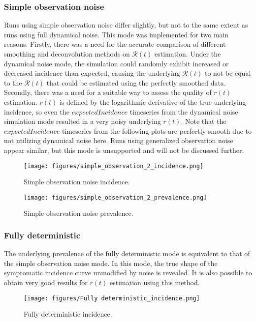 \documentclass{article}
\newcommand{\nR}{\mathscr{R}}
\begin{document}
\subsubsection{Simple observation noise}
Runs using simple observation noise differ slightly, but not to the same extent as runs using full dynamical noise. This mode was implemented for two main reasons. Firstly, there was a need for the accurate comparison of different smoothing and deconvolution methods on $\nR(t)$ estimation. Under the dynamical noise mode, the simulation could randomly exhibit increased or decreased incidence than expected, causing the underlying $\nR(t)$ to not be equal to the $\nR(t)$ that could be estimated using the perfectly smoothed data. Secondly, there was a need for a suitable way to assess the quality of $r(t)$ estimation. $r(t)$ is defined by the logarithmic derivative of the true underlying incidence, so even the $expectedIncidence$ timeseries from the dynamical noise simulation mode resulted in a very noisy underlying $r(t)$. Note that the $expectedIncidence$ timeseries from the following plots are perfectly smooth due to not utilizing dynamical noise here. Runs using generalized observation noise appear similar, but this mode is unsupported and will not be discussed further.

\begin{figure}[h!]
    \centering
    \texttt{[image: figures/simple\_observation\_2\_incidence.png]}
    \caption{Simple observation noise incidence.}
\end{figure}

\clearpage
\begin{figure}[h!]
    \centering
    \texttt{[image: figures/simple\_observation\_2\_prevalence.png]}
    \caption{Simple observation noise prevalence.}
\end{figure}

\subsubsection{Fully deterministic}
The underlying prevalence of the fully deterministic mode is equivalent to that of the simple observation noise mode. In this mode, the true shape of the symptomatic incidence curve unmodified by noise is revealed. It is also possible to obtain very good results for $r(t)$ estimation using this method.

\clearpage
\begin{figure}[h!]
    \centering
    \texttt{[image: figures/Fully deterministic\_incidence.png]}
    \caption{Fully deterministic incidence.}
\end{figure}
\end{document}
